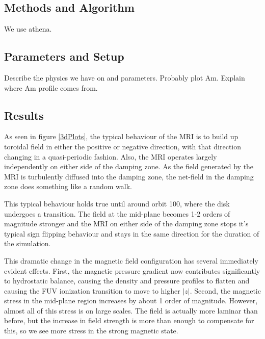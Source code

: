 \subsection{Methods and Algorithm}
We use athena.


\subsection{Parameters and Setup}
Describe the physics we have on and parameters.  Probably plot Am. Explain where Am profile comes from.


\subsection{Results}

As seen in figure \ref{3dPlots}, the typical behaviour of the MRI is to build up toroidal field in either the positive or negative direction, with that direction changing in a quasi-periodic fashion.  Also, the MRI operates largely independently on either side of the damping zone.  As the field generated by the MRI is turbulently diffused into the damping zone, the net-field in the damping zone does something like a random walk.  

This typical behaviour holds true until around orbit 100, where the disk undergoes a transition.  The field at the mid-plane becomes 1-2 orders of magnitude stronger and the MRI on either side of the damping zone stops it's typical sign flipping behaviour and stays in the same direction for the duration of the simulation.

This dramatic change in the magnetic field configuration has several immediately evident effects.  First, the magnetic pressure gradient now contributes significantly to hydrostatic balance, causing the density and pressure profiles to flatten and causing the FUV ionization transition to move to higher $|z|$.  Second, the magnetic stress in the mid-plane region increases by about 1 order of magnitude.  However, almost all of this stress is on large scales.  The field is actually more laminar than before, but the increase in field strength is more than enough to compensate for this, so we see more stress in the strong magnetic state.



